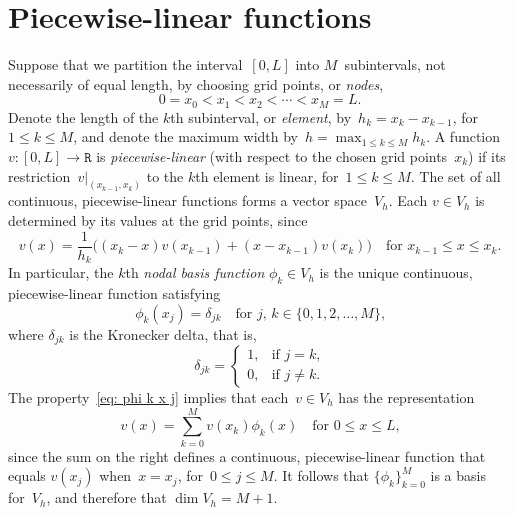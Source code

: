 \section{Piecewise-linear functions}
Suppose that we partition the interval~$[0,L]$ into $M$~subintervals, not 
necessarily of equal length, by choosing grid points, or \emph{nodes},
\begin{equation}\label{eq: 1d nodes}
0=x_0<x_1<x_2<\cdots<x_M=L.
\end{equation}
Denote the length of the $k$th subinterval, or \emph{element}, 
by~$h_k=x_k-x_{k-1}$, for~$1\le k\le M$, and denote the maximum width 
by~$h=\max_{1\le k\le M}h_k$.  A function $v:[0,L]\to\mathtt{R}$ is 
\emph{piecewise-linear} (with respect to the chosen grid points~$x_k$) if its 
restriction~$v|_{(x_{k-1},x_k)}$ to the $k$th element is linear, for~$1\le k\le 
M$.  The set of all continuous, piecewise-linear functions forms a vector 
space~$V_h$.  Each $v\in V_h$ is determined by its values at the grid points, 
since
\[
v(x)=\frac{1}{h_k}\bigl((x_k-x)v(x_{k-1})+(x-x_{k-1})v(x_k)\bigr)
    \quad\text{for $x_{k-1}\le x\le x_k$.}
\]
In particular, the $k$th \emph{nodal basis function} $\phi_k\in V_h$ is the 
unique continuous, piecewise-linear function satisfying
\begin{equation}\label{eq: phi k x j}
\phi_k(x_j)=\delta_{jk}\quad\text{for $j$, $k\in\{0, 1, 2, \ldots, M\}$,}
\end{equation}
where $\delta_{jk}$ is the Kronecker delta, that is,
\[
\delta_{jk}=\begin{cases}
1,&\text{if $j=k$,}\\ 0,&\text{if $j\ne k$.} 
\end{cases}
\]
The property~\eqref{eq: phi k x j} implies that each~$v\in V_h$ has the 
representation
\[
v(x)=\sum_{k=0}^M v(x_k)\phi_k(x)\quad\text{for $0\le x\le L$,}
\]
since the sum on the right defines a continuous, piecewise-linear function that 
equals $v(x_j)$ when~$x=x_j$, for~$0\le j\le M$.  It follows that 
$\{\phi_k\}_{k=0}^M$ is a basis for~$V_h$, and therefore that $\dim V_h=M+1$.

